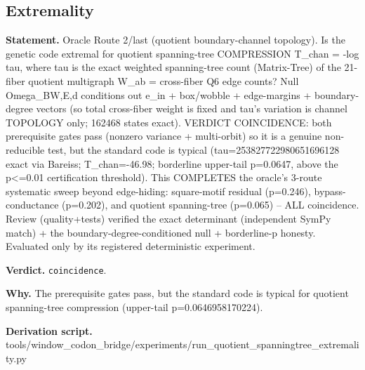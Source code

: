\subsection{Extremality}\label{sec:bridge-extremality}
\textbf{Statement.} Oracle Route 2/last (quotient boundary-channel topology). Is the genetic code extremal for quotient
spanning-tree COMPRESSION T\_chan = -log tau, where tau is the exact weighted spanning-tree count
(Matrix-Tree) of the 21-fiber quotient multigraph W\_ab = cross-fiber Q6 edge counts? Null
Omega\_BW,E,d conditions out e\_in + box/wobble + edge-margins + boundary-degree vectors (so total
cross-fiber weight is fixed and tau's variation is channel TOPOLOGY only; 162468 states exact).
VERDICT COINCIDENCE: both prerequisite gates pass (nonzero variance + multi-orbit) so it is a
genuine non-reducible test, but the standard code is typical (tau=253827722980651696128 exact via
Bareiss; T\_chan=-46.98; borderline upper-tail p=0.0647, above the p<=0.01 certification threshold).
This COMPLETES the oracle's 3-route systematic sweep beyond edge-hiding: square-motif residual
(p=0.246), bypass-conductance (p=0.202), and quotient spanning-tree (p=0.065) -- ALL coincidence.
Review (quality+tests) verified the exact determinant (independent SymPy match) + the
boundary-degree-conditioned null + borderline-p honesty. Evaluated only by its registered
deterministic experiment.

\textbf{Verdict.} \texttt{coincidence}.

\textbf{Why.} The prerequisite gates pass, but the standard code is typical for quotient spanning-tree compression
(upper-tail p=0.0646958170224).

\textbf{Derivation script.} tools/window\_codon\_bridge/experiments/run\_quotient\_spanningtree\_extremality.py

